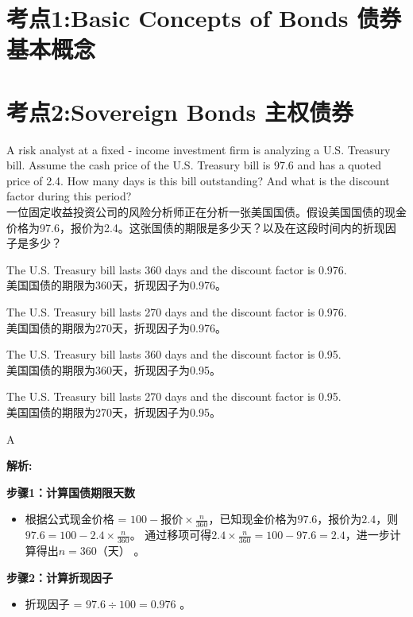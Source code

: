 \documentclass{article}
\newcounter{question} %
\newenvironment{explanation}
{\textbf{解析:}\par}
{\par}
\begin{document}
 \tableofcontents %
\newpage



\section{考点1:Basic Concepts of Bonds 债券基本概念}
\setcounter{question}{0}

\section{考点2:Sovereign Bonds 主权债券}
\setcounter{question}{0}
\begin{question}
    A risk analyst at a fixed - income investment firm is analyzing a U.S. Treasury bill. Assume the cash price of the U.S. Treasury bill is 97.6 and has a quoted price of 2.4. How many days is this bill outstanding? And what is the discount factor during this period?\\
    一位固定收益投资公司的风险分析师正在分析一张美国国债。假设美国国债的现金价格为97.6，报价为2.4。这张国债的期限是多少天？以及在这段时间内的折现因子是多少？
    \end{question}
    
    \begin{choices}
    \item The U.S. Treasury bill lasts 360 days and the discount factor is 0.976.\\
    美国国债的期限为360天，折现因子为0.976。
    \item The U.S. Treasury bill lasts 270 days and the discount factor is 0.976.\\
    美国国债的期限为270天，折现因子为0.976。
    \item The U.S. Treasury bill lasts 360 days and the discount factor is 0.95.\\
    美国国债的期限为360天，折现因子为0.95。
    \item The U.S. Treasury bill lasts 270 days and the discount factor is 0.95.\\
    美国国债的期限为270天，折现因子为0.95。
    \end{choices}
    
    \begin{correctanswer}
    A
    \end{correctanswer}
    
    \begin{explanation}
    \textbf{步骤1：计算国债期限天数}
    \begin{itemize}
    \item 根据公式现金价格 = \(100 - \text{报价}\times\frac{n}{360}\)，已知现金价格为\(97.6\)，报价为\(2.4\)，则\(97.6 = 100 - 2.4\times\frac{n}{360}\)。
    通过移项可得\(2.4\times\frac{n}{360}=100 - 97.6 = 2.4\)，进一步计算得出\(n = 360\)（天） 。
    \end{itemize}
    \textbf{步骤2：计算折现因子}
    \begin{itemize}
    \item 折现因子 = \(97.6\div100 = 0.976\) 。
    \end{itemize}
    \end{explanation}
    
\end{document}
